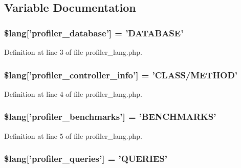 \subsection{Variable Documentation}
\subsubsection[{\$lang}]{\setlength{\rightskip}{0pt plus 5cm}\$lang['profiler\-\_\-database'] = 'D\-A\-T\-A\-B\-A\-S\-E'}\label{profiler__lang_8php_a93beea1bc75788ad2b7d3d3895984282}


Definition at line 3 of file profiler\-\_\-lang.\-php.

\subsubsection[{\$lang}]{\setlength{\rightskip}{0pt plus 5cm}\$lang['profiler\-\_\-controller\-\_\-info'] = 'C\-L\-A\-S\-S/M\-E\-T\-H\-O\-D'}\label{profiler__lang_8php_a13e794a194b3fae4ac89472fa90a39a4}


Definition at line 4 of file profiler\-\_\-lang.\-php.

\subsubsection[{\$lang}]{\setlength{\rightskip}{0pt plus 5cm}\$lang['profiler\-\_\-benchmarks'] = 'B\-E\-N\-C\-H\-M\-A\-R\-K\-S'}\label{profiler__lang_8php_a542e9f6b34cf149d1574a8f6b2c9568d}


Definition at line 5 of file profiler\-\_\-lang.\-php.

\subsubsection[{\$lang}]{\setlength{\rightskip}{0pt plus 5cm}\$lang['profiler\-\_\-queries'] = 'Q\-U\-E\-R\-I\-E\-S'}\label{profiler__lang_8php_ac8efd051248fb102a6cc0c9b418ffd6d}


